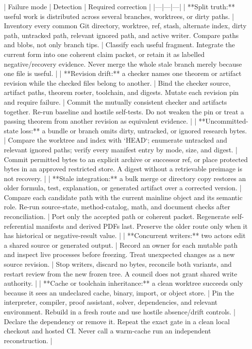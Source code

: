 \documentclass[11pt]{article}
\begin{document}
\begin{markdown}
| Failure mode | Detection | Required correction |
|---|---|---|
| **Split truth:** useful work is distributed across several branches, worktrees, or dirty paths. | Inventory every common Git directory, worktree, ref, stash, alternate index, dirty path, untracked path, relevant ignored path, and active writer. Compare paths and blobs, not only branch tips. | Classify each useful fragment. Integrate the current form into one coherent claim packet, or retain it as labelled negative/recovery evidence. Never merge the whole stale branch merely because one file is useful. |
| **Revision drift:** a checker names one theorem or artifact revision while the checked files belong to another. | Bind the checker source, artifact paths, theorem roster, toolchain, and digests. Mutate each revision pin and require failure. | Commit the mutually consistent checker and artifacts together. Re-run baseline and hostile self-tests. Do not weaken the pin or treat a passing theorem from another revision as equivalent evidence. |
| **Uncommitted-state loss:** a bundle or branch omits dirty, untracked, or ignored research bytes. | Compare the worktree and index with `HEAD`; enumerate untracked and relevant ignored paths; verify every manifest entry by mode, size, and digest. | Commit permitted bytes to an explicit archive or successor ref, or place protected bytes in an approved restricted store. A digest without a retrievable preimage is not recovery. |
| **Stale integration:** a bulk merge or directory copy restores an older formula, test, explanation, or generated artifact over a corrected version. | Compare each candidate path with the current mainline object and its semantic role. Re-run source-state, method-catalog, math, and document checks after reconciliation. | Port only the accepted path or coherent packet. Regenerate self-referential manifests and derived PDFs last. Preserve the older route only when it has historical or negative-result value. |
| **Concurrent writers:** two actors edit a shared source or generated output. | Record an owner for each mutable path and inspect live processes before freezing. Treat unexpected changes as a new source revision. | Stop writers, discard no bytes, reconcile both variants, and restart review from the new frozen tree. A council does not grant shared write authority. |
| **Cache or toolchain inheritance:** a clean worktree succeeds only because it sees an undeclared cache, binary, import, or object store. | Pin the interpreter, compiler, proof assistant, solver, dependencies, and relevant environment. Rebuild in a fresh route and use hostile absence/drift controls. | Declare the dependency or remove it. Repeat the exact gate in a clean local checkout and hosted CI. Never call a warm-cache run an independent reconstruction. |

\end{markdown}
\end{document}
